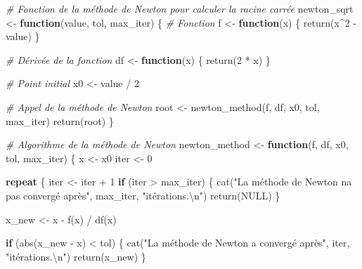 \documentclass[
]{article}
\newenvironment{Shaded}{\begin{snugshade}}{\end{snugshade}}
\newcommand{\CommentTok}[1]{\textcolor[rgb]{0.56,0.35,0.01}{\textit{#1}}}
\newcommand{\ConstantTok}[1]{\textcolor[rgb]{0.00,0.00,0.00}{#1}}
\newcommand{\ControlFlowTok}[1]{\textcolor[rgb]{0.13,0.29,0.53}{\textbf{#1}}}
\newcommand{\DecValTok}[1]{\textcolor[rgb]{0.00,0.00,0.81}{#1}}
\newcommand{\FunctionTok}[1]{\textcolor[rgb]{0.00,0.00,0.00}{#1}}
\newcommand{\NormalTok}[1]{#1}
\newcommand{\OtherTok}[1]{\textcolor[rgb]{0.56,0.35,0.01}{#1}}
\newcommand{\SpecialCharTok}[1]{\textcolor[rgb]{0.00,0.00,0.00}{#1}}
\newcommand{\StringTok}[1]{\textcolor[rgb]{0.31,0.60,0.02}{#1}}
\begin{document}
\begin{Shaded}
\begin{Highlighting}[]
\CommentTok{\# Fonction de la méthode de Newton pour calculer la racine carrée}
\NormalTok{newton\_sqrt }\OtherTok{\textless{}{-}} \ControlFlowTok{function}\NormalTok{(value, tol, max\_iter) \{}
  \CommentTok{\# Fonction}
\NormalTok{  f }\OtherTok{\textless{}{-}} \ControlFlowTok{function}\NormalTok{(x) \{}
    \FunctionTok{return}\NormalTok{(x}\SpecialCharTok{\^{}}\DecValTok{2} \SpecialCharTok{{-}}\NormalTok{ value)}
\NormalTok{  \}}

  \CommentTok{\# Dérivée de la fonction}
\NormalTok{  df }\OtherTok{\textless{}{-}} \ControlFlowTok{function}\NormalTok{(x) \{}
    \FunctionTok{return}\NormalTok{(}\DecValTok{2} \SpecialCharTok{*}\NormalTok{ x)}
\NormalTok{  \}}

  \CommentTok{\# Point initial}
\NormalTok{  x0 }\OtherTok{\textless{}{-}}\NormalTok{ value }\SpecialCharTok{/} \DecValTok{2}

  \CommentTok{\# Appel de la méthode de Newton}
\NormalTok{  root }\OtherTok{\textless{}{-}} \FunctionTok{newton\_method}\NormalTok{(f, df, x0, tol, max\_iter)}
  \FunctionTok{return}\NormalTok{(root)}
\NormalTok{\}}

\CommentTok{\# Algorithme de la méthode de Newton}
\NormalTok{newton\_method }\OtherTok{\textless{}{-}} \ControlFlowTok{function}\NormalTok{(f, df, x0, tol, max\_iter) \{}
\NormalTok{  x }\OtherTok{\textless{}{-}}\NormalTok{ x0}
\NormalTok{  iter }\OtherTok{\textless{}{-}} \DecValTok{0}
  
  \ControlFlowTok{repeat}\NormalTok{ \{}
\NormalTok{    iter }\OtherTok{\textless{}{-}}\NormalTok{ iter }\SpecialCharTok{+} \DecValTok{1}
    \ControlFlowTok{if}\NormalTok{ (iter }\SpecialCharTok{\textgreater{}}\NormalTok{ max\_iter) \{}
      \FunctionTok{cat}\NormalTok{(}\StringTok{"La méthode de Newton n\textquotesingle{}a pas convergé après"}\NormalTok{, max\_iter, }\StringTok{"itérations.}\SpecialCharTok{\textbackslash{}n}\StringTok{"}\NormalTok{)}
      \FunctionTok{return}\NormalTok{(}\ConstantTok{NULL}\NormalTok{)}
\NormalTok{    \}}
    
\NormalTok{    x\_new }\OtherTok{\textless{}{-}}\NormalTok{ x }\SpecialCharTok{{-}} \FunctionTok{f}\NormalTok{(x) }\SpecialCharTok{/} \FunctionTok{df}\NormalTok{(x)}
    
    \ControlFlowTok{if}\NormalTok{ (}\FunctionTok{abs}\NormalTok{(x\_new }\SpecialCharTok{{-}}\NormalTok{ x) }\SpecialCharTok{\textless{}}\NormalTok{ tol) \{}
      \FunctionTok{cat}\NormalTok{(}\StringTok{"La méthode de Newton a convergé après"}\NormalTok{, iter, }\StringTok{"itérations.}\SpecialCharTok{\textbackslash{}n}\StringTok{"}\NormalTok{)}
      \FunctionTok{return}\NormalTok{(x\_new)}
\NormalTok{    \}}
    

\end{Highlighting}
\end{Shaded}
\end{document}
